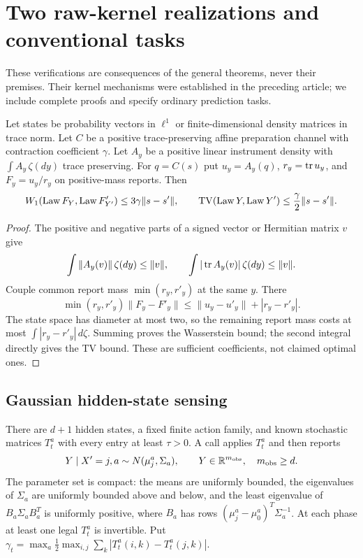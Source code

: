 \section{Two raw-kernel realizations and conventional tasks}\label{sec:realizations}
These verifications are consequences of the general theorems, never their premises. Their kernel mechanisms were established in the preceding article\cite{prior}; we include complete proofs and specify ordinary prediction tasks.

\begin{lemma}\label{lem:coupling}
Let states be probability vectors in $\ell^1$ or finite-dimensional density matrices in trace norm. Let $C$ be a positive trace-preserving affine preparation channel with contraction coefficient $\gamma$. Let $A_y$ be a positive linear instrument density with $\int A_y\,\zeta(dy)$ trace preserving. For $q=C(s)$ put $u_y=A_y(q)$, $r_y=\operatorname{tr} u_y$, and $F_y=u_y/r_y$ on positive-mass reports. Then
\begin{equation}\label{eq:coupling}
 W_1(\operatorname{Law} F_Y,\operatorname{Law} F'_{Y'})\le3\gamma\|s-s'\|,
 \qquad\operatorname{TV}(\operatorname{Law} Y,\operatorname{Law} Y')\le\frac{\gamma}{2}\|s-s'\|.
\end{equation}
\end{lemma}
\begin{proof}
The positive and negative parts of a signed vector or Hermitian matrix $v$ give
\[
 \int\|A_y(v)\|\,\zeta(dy)\le\|v\|,\qquad
 \int|\operatorname{tr} A_y(v)|\,\zeta(dy)\le\|v\|.
\]
Couple common report mass $\min(r_y,r'_y)$ at the same $y$. There
\[
 \min(r_y,r'_y)\|F_y-F'_y\|\le\|u_y-u'_y\|+|r_y-r'_y|.
\]
The state space has diameter at most two, so the remaining report mass costs at most $\int|r_y-r'_y|\,d\zeta$. Summing proves the Wasserstein bound; the second integral directly gives the TV bound. These are sufficient coefficients, not claimed optimal ones.
\end{proof}

\subsection{Gaussian hidden-state sensing}
There are $d+1$ hidden states, a fixed finite action family, and known stochastic matrices $T_t^a$ with every entry at least $\tau>0$. A call applies $T_t^a$ and then reports
\[
 Y\mid X'=j,a\sim N(\mu_j^a,\Sigma_a),\qquad Y\in\mathbb R^{m_{\rm obs}},\quad m_{\rm obs}\ge d.
\]
The parameter set is compact: the means are uniformly bounded, the eigenvalues of $\Sigma_a$ are uniformly bounded above and below, and the least eigenvalue of
$B_a\Sigma_aB_a^T$ is uniformly positive, where $B_a$ has rows $(\mu_j^a-\mu_0^a)^T\Sigma_a^{-1}$. At each phase at least one legal $T_t^a$ is invertible. Put
$\gamma_t=\max_a\frac12\max_{i,j}\sum_k|T_t^a(i,k)-T_t^a(j,k)|$.

